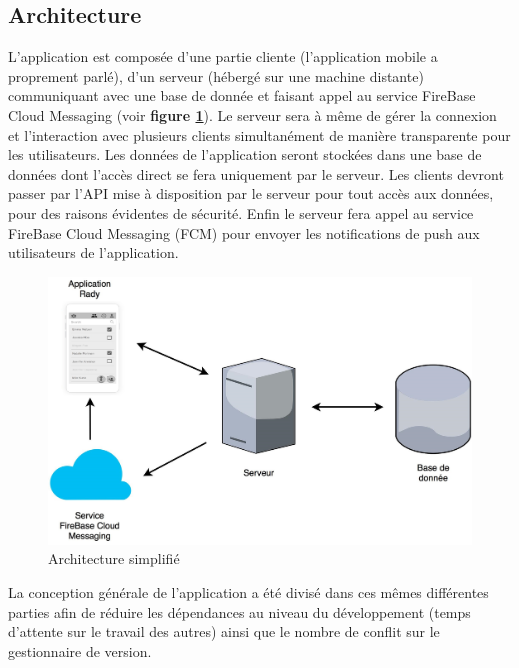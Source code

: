 \documentclass[french]{article}
\begin{document}
		\subsection{Architecture}
		L’application est composée d’une partie cliente (l'application mobile a proprement parlé), d’un serveur (hébergé sur une machine distante) communiquant avec une base de donnée et faisant appel au service FireBase Cloud Messaging (voir \textbf{figure \ref{Architecture simplifié}}). Le serveur sera à même de gérer la connexion et l’interaction avec plusieurs clients simultanément de manière transparente pour les utilisateurs. 
		Les données de l’application seront stockées dans une base de données dont l’accès direct se fera uniquement par le serveur. Les clients devront passer par l'API mise à disposition par le serveur pour tout accès aux données, pour des raisons évidentes de sécurité.
		Enfin le serveur fera appel au service FireBase Cloud Messaging (FCM) pour envoyer les notifications de push aux utilisateurs de l'application. 
		
		\begin{figure}[H]
			\centering
			\includegraphics[scale=0.20]{../schema/schema-simplifie.jpg}
			\caption{Architecture simplifié}
			\label{Architecture simplifié}
		\end{figure}
		
		La conception générale de l'application a été divisé dans ces mêmes différentes parties afin de réduire les dépendances au niveau du développement (temps d'attente sur le travail des autres) ainsi que le nombre de conflit sur le gestionnaire de version.
		
\end{document}
